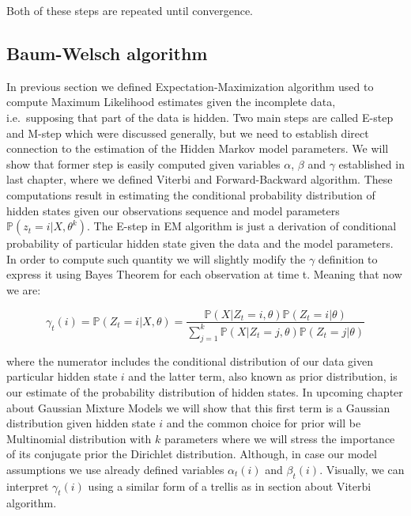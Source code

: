 Both of these steps are repeated until convergence. 

\subsection{Baum-Welsch algorithm}

In previous section we defined Expectation-Maximization algorithm used to compute Maximum Likelihood estimates given the incomplete data, i.e.\ supposing that part of the data is hidden. Two main steps are called E-step and M-step which were discussed generally, but we need to establish direct connection to the estimation of the Hidden Markov model parameters. We will show that former step is easily computed given variables $\alpha$, $\beta$ and $\gamma$ established in last chapter, where we defined Viterbi and Forward-Backward algorithm. These computations result in estimating the conditional probability distribution of hidden states given our observations sequence and model parameters $\mathbb{P}(z_t=i|X,\theta^k)$. The E-step in EM algorithm is just a derivation of conditional probability of particular hidden state given the data and the model parameters. In order to compute such quantity we will slightly modify the $\gamma$ definition to express it using Bayes Theorem for each observation at time t. Meaning that now we are:

\begin{equation}
\gamma_t(i) = \mathbb{P}(Z_t=i|X,\theta) = \frac{\mathbb{P}(X|Z_t=i, \theta) \mathbb{P}(Z_t = i|\theta)}{\sum_{j=1}^k \mathbb{P}(X|Z_t=j,\theta)\mathbb{P}(Z_t = j|\theta)} 
\end{equation}

where the numerator includes the conditional distribution of our data given particular hidden state $i$ and the latter term, also known as prior distribution, is our estimate of the probability distribution of hidden states. In upcoming chapter about Gaussian Mixture Models we will show that this first term is a Gaussian distribution given hidden state $i$ and the common choice for prior will be Multinomial distribution with $k$ parameters where we will stress the importance of its conjugate prior the Dirichlet distribution. Although, in case our model assumptions we use already defined variables $\alpha_t(i)$ and $\beta_t(i)$. Visually, we can interpret $\gamma_t(i)$ using a similar form of a trellis as in section about Viterbi algorithm.

